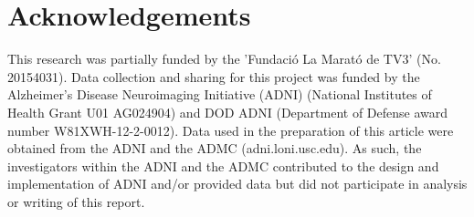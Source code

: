 \section*{Acknowledgements}
This research was partially funded by the 'Fundació La Marató de TV3' (No. 20154031). Data collection and sharing for this project was funded by the Alzheimer’s Disease Neuroimaging Initiative (ADNI) (National Institutes of Health Grant U01 AG024904) and DOD ADNI (Department of Defense award number W81XWH-12-2-0012).  Data used in the preparation of this article were obtained from the ADNI and the ADMC (adni.loni.usc.edu). As such, the investigators within the ADNI and the ADMC contributed to the design and implementation of ADNI and/or provided data but did not participate in analysis or writing of this report.